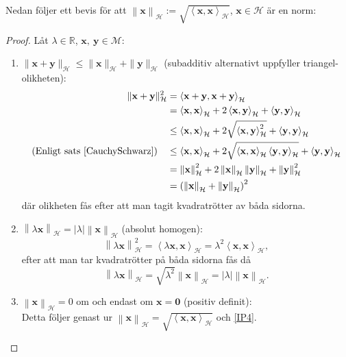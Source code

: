 \documentclass[a4paper, 12pt]{report}
\theoremstyle{definition}
\theoremstyle{remark}
\newcommand{\bfx}{\mathbf{x}}
\newcommand{\llangle}{\left\langle}
\newcommand{\rrangle}{\right\rangle}
\begin{document}
Nedan följer ett bevis för att $\left\| \bfx \right\|_\mathcal{H} := \sqrt{\llangle \bfx , \bfx \rrangle_\mathcal{H}}$, $\bfx \in\mathcal{H}$ är en norm:
\begin{proof}
	Låt $\lambda \in \mathbb{R}$, $\bfx,~\mathbf{y}\in \mathcal{M}$:
	\begin{enumerate}[label=\textbf{N\arabic*}:]
		\item $\| \bfx + \mathbf{y}\|_\mathcal{H} \leq \| \bfx \|_\mathcal{H} + \| \mathbf{y}\|_\mathcal{H}$ (subadditiv alternativt uppfyller triangel-olikheten): 
		\begin{align*}
			\| \bfx + \mathbf{y}\|_\mathcal{H}^2 &= \llangle \bfx + \mathbf{y}, \bfx + \mathbf{y}\rrangle_\mathcal{H}\\
			&= \llangle \bfx, \bfx \rrangle_\mathcal{H} + 2 \llangle \bfx, \mathbf{y}\rrangle_\mathcal{H} + \llangle \mathbf{y}, \mathbf{y} \rrangle_\mathcal{H}\\
			&\leq \llangle \bfx, \bfx \rrangle_\mathcal{H} + 2\sqrt{\llangle \bfx, \mathbf{y}\rrangle^2_\mathcal{H}} + \llangle \mathbf{y}, \mathbf{y} \rrangle_\mathcal{H}\\
			\text{(Enligt sats \ref{CauchySchwarz})}\quad&\leq \llangle \bfx, \bfx \rrangle_\mathcal{H} + 2\sqrt{\llangle \bfx, \bfx\rrangle_ \mathcal{H} \llangle \mathbf{y}, \mathbf{y} \rrangle_\mathcal{H}} + \llangle \mathbf{y}, \mathbf{y} \rrangle_\mathcal{H}\\
			&=\left\|\bfx \right\|^2_\mathcal{H} + 2\left\|\bfx \right\|_\mathcal{H}\left\|\mathbf{y} \right\|_\mathcal{H}  + \left\| \mathbf{y}\right\|^2_\mathcal{H}\\
			&= \left(\left\|\bfx \right\|_\mathcal{H}+ \left\| \mathbf{y}\right\|_\mathcal{H}\right)^2
		\end{align*}
		där olikheten fås efter att man tagit kvadratrötter av båda sidorna.
		\item $\left\| \lambda\bfx \right\|_\mathcal{H} = \left|\lambda\right|\left\| \bfx \right\|_\mathcal{H}$ (absolut homogen):
		\begin{equation}
			\left\| \lambda\bfx \right\|_\mathcal{H}^2 = \llangle \lambda \bfx, \bfx \rrangle_\mathcal{H}
			= \lambda^2 \llangle \bfx, \bfx \rrangle_\mathcal{H},
		\end{equation}
		efter att man tar kvadratrötter på båda sidorna fås då
		\begin{equation*}
			\left\| \lambda\bfx \right\|_\mathcal{H} = \sqrt{\lambda^2}\left\| \bfx \right\|_\mathcal{H} = \left|\lambda\right| \left\| \bfx \right\|_\mathcal{H}.
		\end{equation*}
		\item $\left\| \bfx \right\|_\mathcal{H}=0$ om och endast om $\bfx = \mathbf{0}$ (positiv definit):\\
		Detta följer genast ur $\left\| \bfx \right\|_\mathcal{H} = \sqrt{\llangle \bfx, \bfx \rrangle_\mathcal{H}}$ och \ref{IP4}. \qedhere
	\end{enumerate}
\end{proof}
\end{document}
